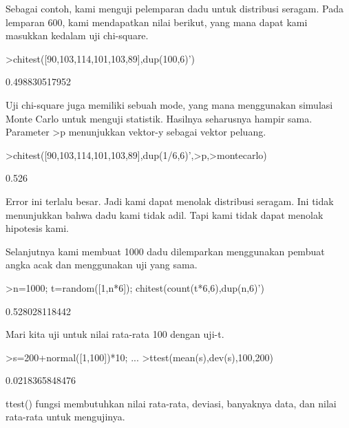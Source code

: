 \documentclass[a4paper,10pt]{article}
\begin{document}
\begin{eulernotebook}
\begin{eulercomment}
Sebagai contoh, kami menguji pelemparan dadu untuk distribusi seragam.
Pada lemparan 600, kami mendapatkan nilai berikut, yang mana dapat
kami masukkan kedalam uji chi-square.
\end{eulercomment}
\begin{eulerprompt}
>chitest([90,103,114,101,103,89],dup(100,6)')
\end{eulerprompt}
\begin{euleroutput}
  0.498830517952
\end{euleroutput}
\begin{eulercomment}
Uji chi-square juga memiliki sebuah mode, yang mana menggunakan
simulasi Monte Carlo untuk menguji statistik. Hasilnya seharusnya
hampir sama. Parameter \textgreater{}p menunjukkan vektor-y sebagai vektor peluang.
\end{eulercomment}
\begin{eulerprompt}
>chitest([90,103,114,101,103,89],dup(1/6,6)',>p,>montecarlo)
\end{eulerprompt}
\begin{euleroutput}
  0.526
\end{euleroutput}
\begin{eulercomment}
Error ini terlalu besar. Jadi kami dapat menolak distribusi seragam.
Ini tidak menunjukkan bahwa dadu kami tidak adil. Tapi kami tidak
dapat menolak hipotesis kami.

Selanjutnya kami membuat 1000 dadu dilemparkan menggunakan pembuat
angka acak dan menggunakan uji yang sama.
\end{eulercomment}
\begin{eulerprompt}
>n=1000; t=random([1,n*6]); chitest(count(t*6,6),dup(n,6)')
\end{eulerprompt}
\begin{euleroutput}
  0.528028118442
\end{euleroutput}
\begin{eulercomment}
Mari kita uji untuk nilai rata-rata 100 dengan uji-t.
\end{eulercomment}
\begin{eulerprompt}
>s=200+normal([1,100])*10; ...
>ttest(mean(s),dev(s),100,200)
\end{eulerprompt}
\begin{euleroutput}
  0.0218365848476
\end{euleroutput}
\begin{eulercomment}
ttest() fungsi membutuhkan nilai rata-rata, deviasi, banyaknya data,
dan nilai rata-rata untuk mengujinya.


\end{eulercomment}
\end{eulernotebook}
\end{document}
